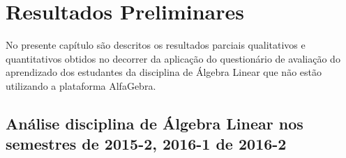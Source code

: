 \chapter{Resultados Preliminares}
\label{cap:resultados}
\noindent No presente capítulo são descritos os resultados parciais qualitativos e quantitativos obtidos no decorrer da aplicação do questionário de avaliação do aprendizado dos estudantes da disciplina de Álgebra Linear que não estão utilizando a plataforma AlfaGebra.

\section{Análise disciplina de Álgebra Linear nos semestres de 2015-2, 2016-1 de 2016-2}

\label{disciplina_3_ultimos_semestre}

